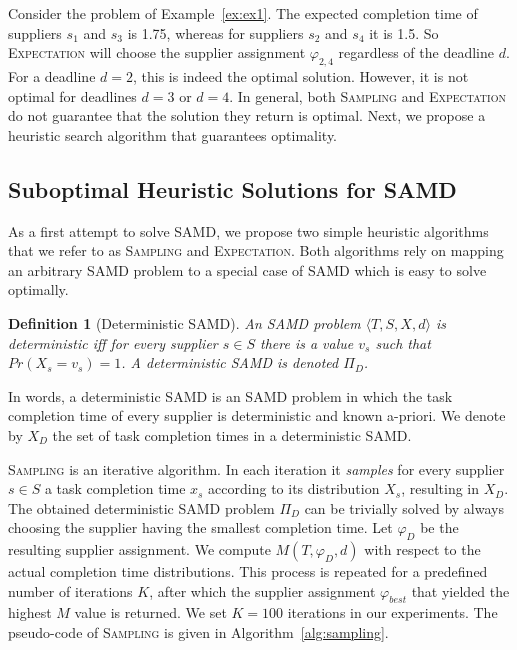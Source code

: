 \documentclass[letterpaper]{article} %
\newtheorem{definition}{Definition}
\newcommand{\tuple}[1]{\langle#1\rangle}
\newcommand{\samd}{\ac{SAMD}\xspace}
\newcommand{\astar}{\textsc{A*}\xspace}
\newcommand{\sampling}{\textsc{Sampling}\xspace}
\newcommand{\expectation}{\textsc{Expectation}\xspace}
\begin{document}
{Consider the problem of Example~\ref{ex:ex1}. The expected completion time of suppliers $s_1$ and $s_3$ is 1.75, whereas for suppliers $s_2$ and $s_4$ it is 1.5. So \expectation will choose the supplier assignment $\varphi_{2,4}$ regardless of the deadline $d$. For a deadline $d=2$, this is indeed the optimal solution. However, it is not optimal for deadlines $d=3$ or $d=4$. In general, both \sampling and \expectation do not guarantee that the solution they return is optimal. Next, we propose a heuristic search algorithm that guarantees optimality. 




}
\subsection{Suboptimal Heuristic Solutions for \samd}
\label{sec:suboptimal}

As a first attempt to solve \samd, we propose two simple heuristic algorithms that we refer to as \sampling and \expectation.
Both algorithms rely on mapping an arbitrary \samd problem to a special case of \samd which is easy to solve optimally.

\begin{definition}[Deterministic \samd] 
An \samd problem $\tuple{T, S, X, d}$ is \emph{deterministic} 
iff for every supplier $s\in S$ there is a value $v_s$ such that $Pr(X_s=v_s)=1$. A deterministic \samd is denoted $\Pi_D$.
\label{def:deterministic}
\end{definition}

In words, a deterministic \samd is an \samd problem in which the task completion time of every supplier is deterministic and known a-priori. %
We denote by $X_D$ the set of task completion times in a deterministic \samd.

\sampling is an iterative algorithm. In each iteration it \emph{samples} for every supplier $s\in S$ a task completion time $x_s$ according to its distribution $X_s$, resulting in $X_D$. The obtained deterministic \samd problem $\Pi_D$ can be trivially solved by always choosing the supplier having the smallest completion time. 
Let $\varphi_D$ be the resulting supplier assignment. We compute $M(T,\varphi_D,d)$ with respect to the actual completion time distributions. This process is repeated for a predefined number of iterations $K$, after which the supplier assignment $\varphi_{best}$ that yielded the highest $M$ value is returned. We set $K=100$ iterations in our experiments. The pseudo-code of \sampling is given in Algorithm~\ref{alg:sampling}.
\end{document}
